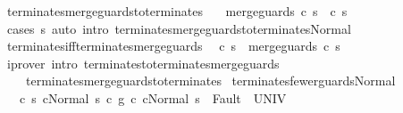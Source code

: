 \begin{isabellebody}
\isamarkupfalse%
%
\endisatagproof
{\isafoldproof}%
%
\isadelimproof
\isanewline
%
\endisadelimproof
\isanewline
{}\isamarkupfalse%
\ terminates{\isacharunderscore}merge{\isacharunderscore}guards{\isacharunderscore}to{\isacharunderscore}terminates{\isacharcolon}\isanewline
\ \ \ {\isachardoublequoteopen}{\isasymGamma}{\isasymturnstile}merge{\isacharunderscore}guards\ c{\isasymdown}\ s\ {\isasymLongrightarrow}\ {\isasymGamma}{\isasymturnstile}c{\isasymdown}\ s{\isachardoublequoteclose}\isanewline
%
\isadelimproof
%
\endisadelimproof
%
\isatagproof
{}\isamarkupfalse%
\ {\isacharparenleft}cases\ s{\isacharparenright}\ {\isacharparenleft}auto\ intro{\isacharcolon}\ terminates{\isacharunderscore}merge{\isacharunderscore}guards{\isacharunderscore}to{\isacharunderscore}terminates{\isacharunderscore}Normal{\isacharparenright}%
\endisatagproof
{\isafoldproof}%
%
\isadelimproof
\isanewline
%
\endisadelimproof
\isanewline
{}\isamarkupfalse%
\ terminates{\isacharunderscore}iff{\isacharunderscore}terminates{\isacharunderscore}merge{\isacharunderscore}guards{\isacharcolon}\isanewline
\ \ {\isachardoublequoteopen}{\isasymGamma}{\isasymturnstile}c{\isasymdown}\ s\ {\isacharequal}\ {\isasymGamma}{\isasymturnstile}merge{\isacharunderscore}guards\ c{\isasymdown}\ s{\isachardoublequoteclose}\isanewline
%
\isadelimproof
\ \ %
\endisadelimproof
%
\isatagproof
{}\isamarkupfalse%
\ {\isacharparenleft}iprover\ intro{\isacharcolon}\ terminates{\isacharunderscore}to{\isacharunderscore}terminates{\isacharunderscore}merge{\isacharunderscore}guards\ \isanewline
\ \ \ \ terminates{\isacharunderscore}merge{\isacharunderscore}guards{\isacharunderscore}to{\isacharunderscore}terminates{\isacharparenright}%
\endisatagproof
{\isafoldproof}%
%
\isadelimproof
%
\endisadelimproof
%
\isamarkuptrue%
\isamarkupfalse%
\ terminates{\isacharunderscore}fewer{\isacharunderscore}guards{\isacharunderscore}Normal{\isacharcolon}\isanewline
\ \ \ {\isachardoublequoteopen}{\isasymAnd}c\ s{\isachardot}\ {\isasymlbrakk}{\isasymGamma}{\isasymturnstile}c{\isacharprime}{\isasymdown}Normal\ s{\isacharsemicolon}\ c\ {\isasymsubseteq}\isactrlsub g\ c{\isacharprime}{\isacharsemicolon}\ {\isasymGamma}{\isasymturnstile}{\isasymlangle}c{\isacharprime}{\isacharcomma}Normal\ s\ {\isasymrangle}\ {\isasymRightarrow}{\isasymnotin}Fault\ {\isacharbackquote}\ UNIV{\isasymrbrakk}\isanewline

\end{isabellebody}

